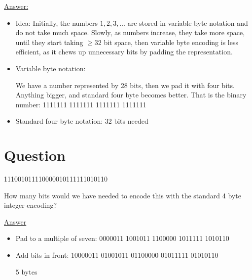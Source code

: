 \documentclass[12pt]{article}
\begin{document}
\underline{Answer:}

\begin{itemize}
  \item Idea: Initially, the numbers $1,2,3,\ldots$ are stored in variable byte notation
	 and do not take much space.
	 Slowly, as numbers increase, they take more space, until they start taking $\geq 32$
	 bit space, then variable byte encoding is less efficient,
	 as it chews up unnecessary bits by padding the representation.

  \item Variable byte notation: 

	 We have a number represented by 28 bits, then we pad it with four bits.	
	 Anything bigger, and standard four byte becomes better.
	 That is the binary number: 1111111 1111111 1111111 1111111	 

  \item Standard four byte notation: 32 bits needed
\end{itemize} 


\section{Question}


111001011110000010111111010110

How many bits would we have needed to encode this with the standard 4 byte integer encoding?

\underline{Answer}

\begin{itemize}
  \item Pad to a multiple of seven:
	 0000011 1001011 1100000 1011111 1010110
  \item Add bits in front:
	 10000011 01001011 01100000 01011111 01010110

	 5 bytes
\end{itemize}

\end{document}
